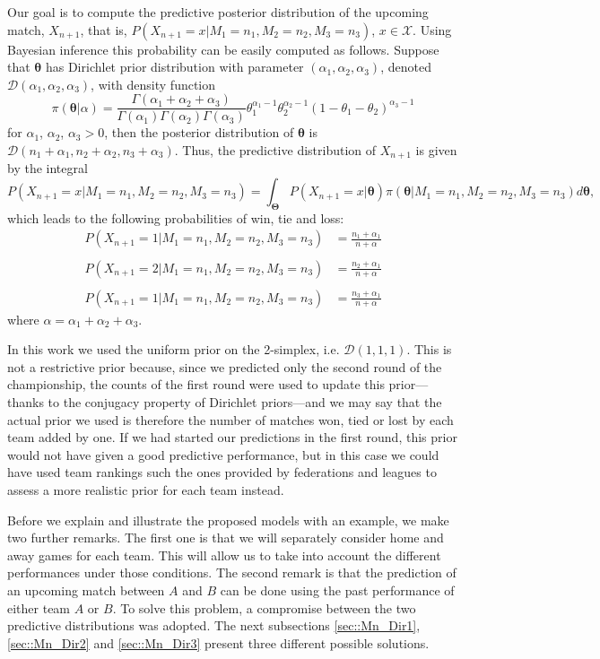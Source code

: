 \documentclass[journal,article,accept,moreauthors,pdftex,12pt,a4paper]{mdpi}
\begin{document}
Our goal is to compute the predictive posterior distribution of the
upcoming match, $X_{n+1}$, that is,
$P(X_{n+1}=x|M_1=n_1,M_2=n_2,M_3=n_3)$, $x\in\mathcal{X}$. Using
Bayesian inference this probability can be easily computed as
follows. Suppose that $\boldsymbol{\theta}$ has Dirichlet prior distribution
with parameter $(\alpha_1,\alpha_2,\alpha_3)$, denoted
$\mathcal{D}(\alpha_1,\alpha_2,\alpha_3)$, with density function
\[
\pi(\boldsymbol{\theta}|\alpha)=\frac{\Gamma(\alpha_1+\alpha_2+\alpha_3)}{\Gamma(\alpha_1)\Gamma(\alpha_2)\Gamma(\alpha_3)}\theta_1^{\alpha_1-1}\theta_2^{\alpha_2-1}(1-\theta_1-\theta_2)^{\alpha_3-1}
\]
\noindent for $\alpha_1$, $\alpha_2$, $\alpha_3 > 0$, then the
posterior distribution of $\boldsymbol{\theta}$ is
$\mathcal{D}(n_1+\alpha_1,n_2+\alpha_2,n_3+\alpha_3)$. Thus, the
predictive distribution of $X_{n + 1}$ is given by the
integral
$$
P(X_{n + 1} = x | M_1 = n_1, M_2 = n_2, M_3 = n_3) = \int_{\boldsymbol{\Theta}} P(X_{n
+ 1} = x | \boldsymbol{\theta}) \pi(\boldsymbol{\theta} | M_1 = n_1, M_2 = n_2, M_3
= n_3) d\boldsymbol{\theta},
$$
which leads to the following probabilities of win, tie and loss:
\begin{align*}
P(X_{n+1} = 1 | M_1=n_1,M_2=n_2,M_3=n_3) &=
\frac{n_1+\alpha_1}{n+\alpha}\\
& \\
P(X_{n+1} = 2 | M_1=n_1,M_2=n_2,M_3=n_3) &=
\frac{n_2+\alpha_1}{n+\alpha} \\
& \\
P(X_{n+1} = 1 | M_1=n_1, M_2=n_2, M_3=n_3) &=
\frac{n_3+\alpha_1}{n+\alpha}
\end{align*}
\noindent where $\alpha=\alpha_1+\alpha_2+\alpha_3$.

In this work we used the uniform prior on the 2-simplex, i.e. $\mathcal{D}(1,1,1)$. 
This is not a restrictive prior because, since we predicted only the second round of the championship, the counts of the first round were used to update this prior---thanks to the conjugacy property of Dirichlet priors---and we may say that the actual prior we used is therefore the number of matches won, tied or lost by each team added by one.
If we had started our predictions in the first round, this prior would not have given 
a good predictive performance, but in this case we could have used team rankings such the ones provided by federations and leagues to assess a more realistic prior for each team instead.

Before we explain and illustrate the proposed models with an example, we make two further remarks.
The first one is that we will separately consider home and away games for each team. This will allow us to take into account the different performances under those conditions.
The second remark is that the prediction of an upcoming match between $A$ and $B$ can be done using
the past performance of either team $A$ or $B$.
To solve this problem, a compromise between the two predictive distributions was adopted. 
The next subsections \ref{sec::Mn_Dir1}, \ref{sec::Mn_Dir2} and \ref{sec::Mn_Dir3} present three different possible solutions.
\end{document}
